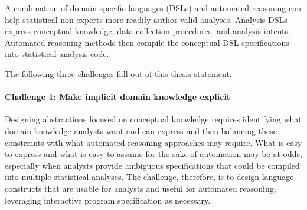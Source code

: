 

A combination of domain-specific languages (DSLs) and automated reasoning can
help statistical non-experts more readily author valid analyses. Analysis DSLs
express conceptual knowledge, data collection procedures, and
analysis intents. Automated reasoning methods then compile the conceptual
DSL specifications into statistical analysis code.


The following three challenges fall out of this thesis statement.

\def\thesisChallengeExplicit{\textbf{Thesis Challenge 1: Explicating domain knowledge}}
\paragraph{Challenge 1: Make implicit domain knowledge explicit} %
Designing abstractions focused on conceptual knowledge requires identifying what
domain knowledge analysts want and can express and then balancing these
constraints with what automated reasoning approaches may require. What is easy
to express and what is easy to assume for the sake of automation may be at odds,
especially when analysts provide ambiguous specifications that could be compiled
into multiple statistical analyses. The challenge, therefore, is to design
language constructs that are usable for analysts and useful for automated
reasoning, leveraging interactive program specification as necessary.


